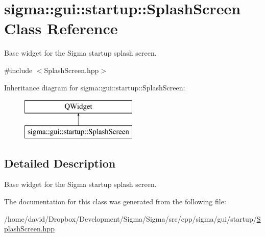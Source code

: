 \hypertarget{classsigma_1_1gui_1_1startup_1_1_splash_screen}{\section{sigma\-:\-:gui\-:\-:startup\-:\-:Splash\-Screen Class Reference}
\label{classsigma_1_1gui_1_1startup_1_1_splash_screen}
}


Base widget for the Sigma startup splash screen.  




{\ttfamily \#include $<$Splash\-Screen.\-hpp$>$}

Inheritance diagram for sigma\-:\-:gui\-:\-:startup\-:\-:Splash\-Screen\-:\begin{figure}[H]
\begin{center}
\leavevmode
\includegraphics[height=2.000000cm]{classsigma_1_1gui_1_1startup_1_1_splash_screen}
\end{center}
\end{figure}


\subsection{Detailed Description}
Base widget for the Sigma startup splash screen. 

The documentation for this class was generated from the following file\-:\begin{DoxyCompactItemize}
\item 
/home/david/\-Dropbox/\-Development/\-Sigma/\-Sigma/src/cpp/sigma/gui/startup/\hyperlink{_splash_screen_8hpp}{Splash\-Screen.\-hpp}\end{DoxyCompactItemize}
